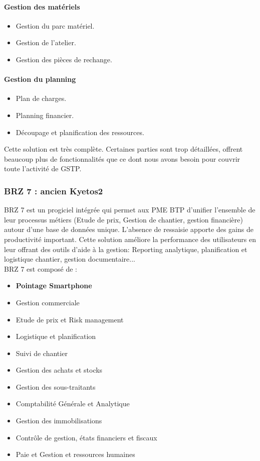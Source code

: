 				\paragraph{Gestion des matériels}
				\begin{itemize}
				    \item Gestion du parc matériel.
				    \item Gestion de l'atelier.
				    \item Gestion des pièces de rechange.
				\end{itemize}
				
				\paragraph{Gestion du planning}
				\begin{itemize}
				    \item Plan de charges.
				    \item Planning financier.
				    \item Découpage et planification des ressources.
				\end{itemize}
				
		Cette solution est très complète. Certaines parties sont trop détaillées, offrent beaucoup plus de fonctionnalités que ce dont nous avons besoin pour couvrir toute l'activité de GSTP.
			
		\subsubsection{BRZ 7 : ancien Kyetos2}
		
		BRZ 7 est un progiciel intégrée qui permet aux PME BTP d'unifier l'ensemble de leur processus métiers (Etude de prix, Gestion de chantier, gestion financière) autour d'une base de données unique. 
    L'absence de ressaisie apporte des gains de productivité important. 
    Cette solution améliore la performance des utilisateurs en leur offrant des outils d'aide à la gestion: Reporting analytique, 
    planification et logistique chantier, gestion documentaire...\\ 
		BRZ 7 est composé de :
 		
     \begin{itemize}
		  \item \textbf{Pointage Smartphone}
		  \item Gestion commerciale
		  \item Etude de prix et Risk management
		  \item Logistique et planification
		  \item Suivi de chantier
		  \item Gestion des achats et stocks
		  \item Gestion des sous-traitants
		  \item Comptabilité Générale et Analytique
		  \item Gestion des immobilisations
		  \item Contrôle de gestion, états financiers et fiscaux
		  \item Paie et Gestion et ressources humaines\\
		\end{itemize}
		
